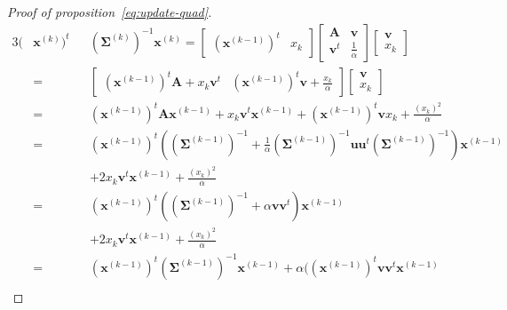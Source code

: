 \documentclass[journal]{IEEEtran}
\begin{document}
\begin{proof}[Proof of proposition~\ref{eq:update-quad}]
    \begin{alignat*}{3}
    (&\mathbf{x}^{(k)})^t && (\boldsymbol{\Sigma}^{(k)})^{-1} \mathbf{x}^{(k)}
       = \left[\begin{array}{cc} (\mathbf{x}^{(k-1)})^t   & x_k \end{array}\right]
                                                            \left[\begin{array}{cc}
                                                                    \mathbf{A}   & \mathbf{v} \\
                                                                    \mathbf{v}^t & \frac{1}{\alpha}
                                                                  \end{array}\right]
                                                                                   \left[\begin{array}{c} \mathbf{v} \\ x_k \end{array}\right] \\
     &= &&\left[\begin{array}{cc} (\mathbf{x}^{(k-1)})^t \mathbf{A} + x_k \mathbf{v}^t & (\mathbf{x}^{(k-1)})^t \mathbf{v} + \frac{x_k}{\alpha} \end{array}\right]
                                                                                       \left[\begin{array}{c} \mathbf{v} \\ x_k \end{array}\right] \\
     &= &&(\mathbf{x}^{(k-1)})^t \mathbf{A} \mathbf{x}^{(k-1)} + x_k \mathbf{v}^t \mathbf{x}^{(k-1)} + (\mathbf{x}^{(k-1)})^t \mathbf{v} x_k + \frac{(x_k)^2}{\alpha} \\
     &= &&(\mathbf{x}^{(k-1)})^t ((\boldsymbol{\Sigma}^{(k-1)})^{-1} + \frac{1}{\alpha} (\boldsymbol{\Sigma}^{(k-1)})^{-1} \mathbf{u} \mathbf{u}^t (\boldsymbol{\Sigma}^{(k-1)})^{-1}) \mathbf{x}^{(k-1)}\\
     & &&+ 2 x_k \mathbf{v}^t \mathbf{x}^{(k-1)} + \frac{(x_k)^2}{\alpha} \\
     &= &&(\mathbf{x}^{(k-1)})^t ((\boldsymbol{\Sigma}^{(k-1)})^{-1} + \alpha \mathbf{v} \mathbf{v}^t) \mathbf{x}^{(k-1)}\\
     & &&+ 2 x_k \mathbf{v}^t \mathbf{x}^{(k-1)} + \frac{(x_k)^2}{\alpha} \\
     &= &&(\mathbf{x}^{(k-1)})^t (\boldsymbol{\Sigma}^{(k-1)})^{-1} \mathbf{x}^{(k-1)} + \alpha ( (\mathbf{x}^{(k-1)})^t \mathbf{v} \mathbf{v}^t \mathbf{x}^{(k-1)} \\

\end{alignat*}
\end{proof}
\end{document}
